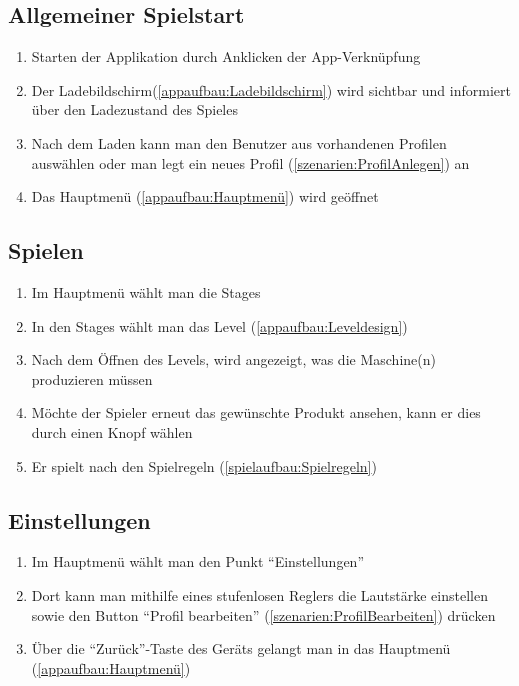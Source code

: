 \documentclass{scrartcl}
\begin{document}
\subsection{Allgemeiner Spielstart} \label{szenarien:allg_spielstart}
	\begin{enumerate}
		\item Starten der Applikation durch Anklicken der App-Verknüpfung
		\item Der Ladebildschirm(\ref{appaufbau:Ladebildschirm}) wird sichtbar und informiert über den Ladezustand des Spieles
		\item Nach dem Laden kann man den Benutzer aus vorhandenen Profilen auswählen oder man legt ein neues Profil (\ref{szenarien:ProfilAnlegen}) an
		\item Das Hauptmenü (\ref{appaufbau:Hauptmenü}) wird geöffnet		
	\end{enumerate}
	
\subsection{Spielen} \label{szenarien:spielen}
	\begin{enumerate}
		\item Im Hauptmenü wählt man die Stages
		\item In den Stages wählt man das Level (\ref{appaufbau:Leveldesign})
		\item Nach dem Öffnen des Levels, wird angezeigt, was die Maschine(n) produzieren müssen
		\item Möchte der Spieler erneut das gewünschte Produkt ansehen, kann er dies durch einen Knopf wählen
		\item Er spielt nach den Spielregeln (\ref{spielaufbau:Spielregeln})
	\end{enumerate}
	
\subsection{Einstellungen} \label{szenarien:einstellungen}
	\begin{enumerate}
		\item Im Hauptmenü wählt man den Punkt \enquote{Einstellungen}
		\item Dort kann man mithilfe eines stufenlosen Reglers die Lautstärke einstellen sowie den Button \enquote{Profil bearbeiten} (\ref{szenarien:ProfilBearbeiten}) drücken
		\item Über die \enquote{Zurück}-Taste des Geräts gelangt man in das Hauptmenü (\ref{appaufbau:Hauptmenü})
	\end{enumerate}
\end{document}
